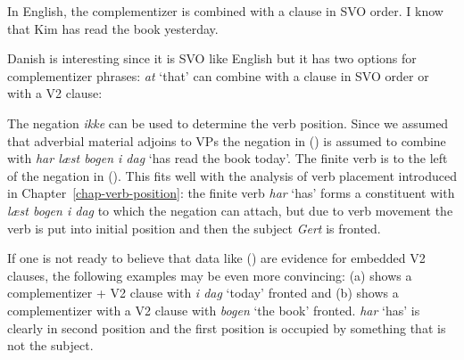 In English, the complementizer is combined with a clause in SVO order.
\ea
I  know that Kim has read the book yesterday.
\z


Danish is interesting since it is SVO like English but it has two options for complementizer
phrases: \emph{at} `that' can combine with a clause in SVO order or with a V2 clause:
\z

The negation \emph{ikke} can be used to determine the verb position. Since we assumed that adverbial
material adjoins to VPs the negation in () is assumed to combine with \emph{har læst bogen i
  dag} `has read the book today'. The finite verb is to the left of the negation in (). This
fits well with the analysis of verb placement introduced in Chapter~\ref{chap-verb-position}: the
finite verb \emph{har} `has' forms a constituent with \emph{læst  bogen i dag} to which the negation can attach, but
due to verb movement the verb is put into initial position and then the subject \emph{Gert} is fronted.
\z

If one is not ready to believe that data like () are evidence for embedded V2 clauses, the
following examples may be even more convincing:
\eal
{}
\zl
(a) shows a complementizer + V2 clause with \emph{i dag} `today' fronted and (b) shows
a complementizer with a V2 clause with \emph{bogen} `the book' fronted. \emph{har} `has' is clearly
in second position and the first position is occupied by something that is not the subject.


